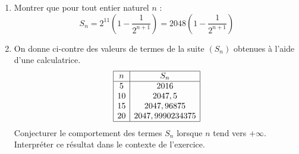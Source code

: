 \documentclass[a4paper,12pt]{article}
\begin{document}
\begin{enumerate}
\item Montrer que pour tout entier naturel $n$ :
\[
S_n = 2^{11} \left(1 - \frac{1}{2^{n+1}}\right) = 2048 \left(1 - \frac{1}{2^{n+1}}\right)
\]

\item On donne ci-contre des valeurs de termes de la suite $(S_n)$ obtenues à l'aide d'une calculatrice.
\[
\begin{array}{|c|c|}
\hline
n & S_n \\
\hline
5 & 2016 \\
10 & 2047,5 \\
15 & 2047,96875 \\
20 & 2047,9990234375 \\
\hline
\end{array}
\]
Conjecturer le comportement des termes $S_n$ lorsque $n$ tend vers $+\infty$. Interpréter ce résultat dans le contexte de l'exercice.
\end{enumerate}
\end{document}
